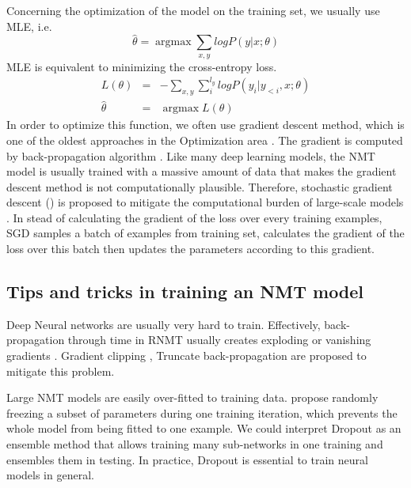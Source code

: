 Concerning the optimization of the model on the training set, we usually use MLE, i.e.
\begin{equation}
\hat{\theta} = \displaystyle{\mathop{argmax}\mathop{\sum}_{x,y}}log P(y|x;\theta)
\label{eq:mle}
\end{equation}
MLE is equivalent to minimizing the cross-entropy loss.
\begin{equation}
\begin{array}{rcl}
L(\theta) &=& -\displaystyle{\mathop{\sum}_{x,y} \mathop{\sum}_{i}^{l_y}}log P(y_i|y_{<i},x;\theta) \\
\hat{\theta} &=& \displaystyle{\mathop{argmax}} L(\theta)
\end{array}
\end{equation}
In order to optimize this function, we often use gradient descent method, which is one of the oldest approaches in the Optimization area \citep{Cauchy1847method}. The gradient is computed by back-propagation algorithm \citep{Rumelhart88learning}. Like many deep learning models, the NMT model is usually trained with a massive amount of data that makes the gradient descent method is not computationally plausible. Therefore, stochastic gradient descent () is proposed to mitigate the computational burden of large-scale models \citep{Herbert51stochastic,Kiefer52stochastic,Bottou10large}. In stead of calculating the gradient of the loss over every training examples, SGD samples a batch of examples from training set, calculates the gradient of the loss over this batch then updates the parameters according to this gradient.
\subsection{Tips and tricks in training an NMT model}
Deep Neural networks are usually very hard to train. Effectively, back-propagation through time in RNMT usually creates exploding or vanishing gradients \cite{Pascanu13onthe,Glorot10understanding}. Gradient clipping \citep{Pascanu13onthe}, Truncate back-propagation \citep{Jaeger02tutorial} are proposed to mitigate this problem.

Large NMT models are easily over-fitted to training data. \citet{Srivastava14Dropout} propose randomly freezing a subset of parameters during one training iteration, which prevents the whole model from being fitted to one example. We could interpret Dropout as an ensemble method that allows training many sub-networks in one training and ensembles them in testing. In practice, Dropout is essential to train neural models in general. 

